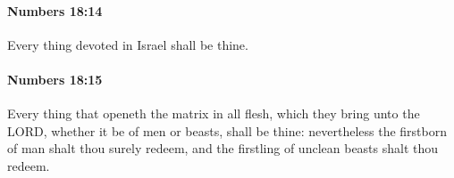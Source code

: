 		\paragraph{Numbers 18:14} %
			\label{NUMBERS-18-14}

			Every thing devoted in Israel shall be thine.


		\paragraph{Numbers 18:15} %
			\label{NUMBERS-18-15}

			Every thing that openeth the matrix in all flesh, which they bring unto the LORD, whether it be of men or beasts, shall be thine: nevertheless the firstborn of man shalt thou surely redeem, and the firstling of unclean beasts shalt thou redeem.


